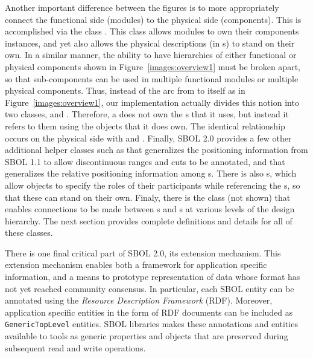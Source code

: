 Another important difference between the figures is to more appropriately connect the functional side (modules) to the physical side (components). This is accomplished via the class . This class allows modules to own their components instances, and yet also allows the physical descriptions (in s) to stand on their own. In a similar manner, the ability to have hierarchies of either functional or physical components shown in Figure~\ref{images:overview1} must be broken apart, so that sub-components can be used in multiple functional modules or multiple physical components. Thus, instead of the arc from  to itself as in Figure~\ref{images:overview1}, our implementation actually divides this notion into two classes,  and . Therefore, a  does not own the s that it uses, but instead it refers to them using the  objects that it does own.  The identical relationship occurs on the physical side with  and . Finally, SBOL 2.0 provides a few other additional helper classes such as  that generalizes the positioning information from SBOL 1.1 to allow discontinuous ranges and cuts to be annotated, and  that generalizes the relative positioning information among s.  There is also 
s, which allow  objects to specify the roles of their participants while referencing the s, so that these can stand on their own. Finaly, there is the  class (not shown) that enables connections to be made between s and s at various levels of the design hierarchy.  The next section provides complete definitions and details for all of these classes.

There is one final critical part of SBOL 2.0, its extension mechanism.  This extension mechanism enables both a framework for application specific information, and a means to prototype representation of data whose format has not yet reached community consensus.  In particular, each SBOL entity can be annotated using the \emph{Resource Description Framework} (RDF). Moreover, application specific entities in the form of RDF documents can be included as \texttt{GenericTopLevel} entities. SBOL libraries makes these annotations and entities available to tools as generic properties and objects that are preserved during subsequent read and write operations. 


